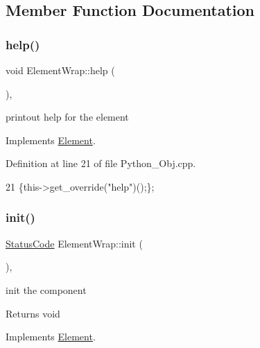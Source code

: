 \subsection{Member Function Documentation}
\mbox{\label{structElementWrap_ad22ed533c2dad73f8650243d8060b547}} 
\subsubsection{\texorpdfstring{help()}{help()}}
{\footnotesize\ttfamily void Element\+Wrap\+::help (\begin{DoxyParamCaption}{ }\end{DoxyParamCaption})\hspace{0.3cm}{\ttfamily [inline]}, {\ttfamily [virtual]}}

printout help for the element 

Implements \hyperlink{classElement_a32c0de27acb08e17251cef88c3e9303a}{Element}.



Definition at line 21 of file Python\+\_\+\+Obj.\+cpp.


\begin{DoxyCode}
21 \{this->get\_override(\textcolor{stringliteral}{"help"})();\};
\end{DoxyCode}
\mbox{\label{structElementWrap_a5e0ca7bd04cfb1f7582fc80c065fd376}} 
\subsubsection{\texorpdfstring{init()}{init()}}
{\footnotesize\ttfamily \hyperlink{classStatusCode}{Status\+Code} Element\+Wrap\+::init (\begin{DoxyParamCaption}{ }\end{DoxyParamCaption})\hspace{0.3cm}{\ttfamily [inline]}, {\ttfamily [virtual]}}

init the component

\begin{DoxyReturn}{Returns}
void 
\end{DoxyReturn}


Implements \hyperlink{classElement_af42754b5cabc198869222725218d695c}{Element}.



